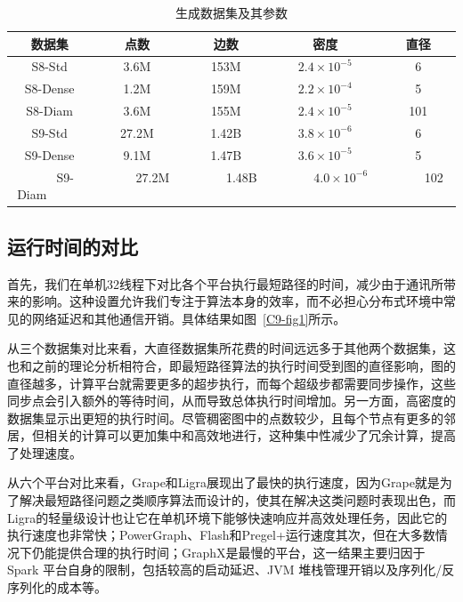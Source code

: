 \begin{table}[h]\centering
    \def\arraystretch{1.5}
	\caption{生成数据集及其参数}
	\label{tab:syn_data}
	\begin{tabular}{c|c|c|c|c}
		\hline
		数据集 & 点数 & 边数 & 密度 & 直径 \\ \hline \hline
		S8-Std            & 3.6M       & 153M       & $2.4 \times 10^{-5}$     & 6                           \\ \hline
		S8-Dense          & 1.2M       & 159M       & $2.2 \times 10^{-4}$     & 5                           \\ \hline
		S8-Diam           & 3.6M       & 155M       & $2.4 \times 10^{-5}$     & 101                         \\ \hline
		S9-Std            & 27.2M      & 1.42B      & $3.8 \times 10^{-6}$     & 6          \\ \hline
		S9-Dense          & 9.1M       & 1.47B      & $3.6 \times 10^{-5}$     & 5                            \\ \hline
        \ \ \ \ \ S9-Diam   \ \ \ \ \  &  \ \ \ \ \ 27.2M \ \ \ \ \      &  \ \ \ \ \ 1.48B  \ \ \ \ \ &  \ \ \ \ \ $4.0 \times 10^{-6}$  \ \ \ \ \ &  \ \ \ \ \ 102   \ \ \ \ \  \\ \hline
	\end{tabular}
\end{table}


\subsection{运行时间的对比}

首先，我们在单机32线程下对比各个平台执行最短路径的时间，减少由于通讯所带来的影响。这种设置允许我们专注于算法本身的效率，而不必担心分布式环境中常见的网络延迟和其他通信开销。具体结果如图~\ref{C9-fig1}所示。

从三个数据集对比来看，大直径数据集所花费的时间远远多于其他两个数据集，这也和之前的理论分析相符合，即最短路径算法的执行时间受到图的直径影响，图的直径越多，计算平台就需要更多的超步执行，而每个超级步都需要同步操作，这些同步点会引入额外的等待时间，从而导致总体执行时间增加。另一方面，高密度的数据集显示出更短的执行时间。尽管稠密图中的点数较少，且每个节点有更多的邻居，但相关的计算可以更加集中和高效地进行，这种集中性减少了冗余计算，提高了处理速度。

从六个平台对比来看，Grape和Ligra展现出了最快的执行速度，因为Grape就是为了解决最短路径问题之类顺序算法而设计的，使其在解决这类问题时表现出色，而Ligra的轻量级设计也让它在单机环境下能够快速响应并高效处理任务，因此它的执行速度也非常快；PowerGraph、Flash和Pregel+运行速度其次，但在大多数情况下仍能提供合理的执行时间；GraphX是最慢的平台，这一结果主要归因于 Spark 平台自身的限制，包括较高的启动延迟、JVM 堆栈管理开销以及序列化/反序列化的成本等。

